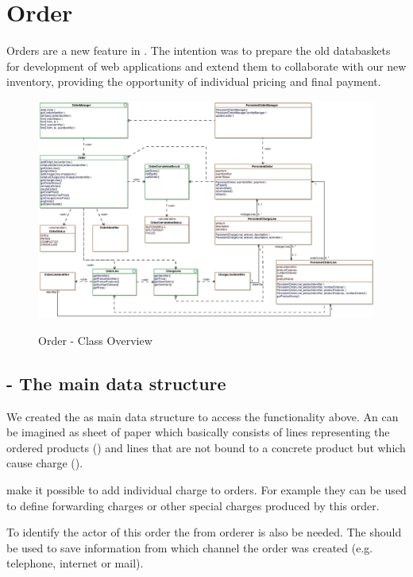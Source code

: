 \newpage
\section{Order}
Orders are a new feature in \salespoint. The intention was to prepare the old databaskets for development of web applications and extend them to collaborate with our new inventory, providing the opportunity of individual pricing and final payment.

\begin{figure}[ht]
	\centering
  \includegraphics[width=1.0\textwidth]{images/Order_Overview.eps}
	\label{order_overview}
	\caption{Order - Class Overview}
\end{figure}

\subsection{ - The main data structure}
We created the  as main data structure to access the functionality above. An  can be imagined as sheet of paper which basically consists of lines representing the ordered products () and lines that are not bound to a concrete product but which cause charge ().

 make it possible to add individual charge to orders. For example they can be used to define forwarding charges or other special charges produced by this order.

To identify the actor of this order the  from orderer is also be needed. The  should be used to save information from which channel the order was created (e.g. telephone, internet or mail).

